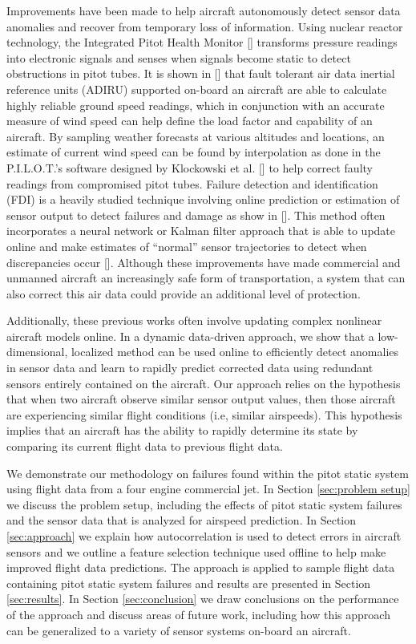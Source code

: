 \documentclass[]{aiaa-tc}
\begin{document}
Improvements have been made to help aircraft autonomously detect sensor data anomalies and recover from temporary loss of information. Using nuclear reactor technology, the Integrated Pitot Health Monitor [] transforms pressure readings into electronic signals and senses when signals become static to detect obstructions in pitot tubes. It is shown in [] that fault tolerant air data inertial reference units (ADIRU) supported on-board an aircraft are able to calculate highly reliable ground speed readings, which in conjunction with an accurate measure of wind speed can help define the load factor and capability of an aircraft. By sampling weather forecasts at various altitudes and locations, an estimate of current wind speed can be found by interpolation as done in the P.I.L.O.T.'s software designed by Klockowski et al. [] to help correct faulty readings from compromised pitot tubes. Failure detection and identification (FDI) is a heavily studied technique involving online prediction or estimation of sensor output to detect failures and damage as show in []. This method often incorporates a neural network or Kalman filter approach that is able to update online and make estimates of ``normal'' sensor trajectories to  detect when discrepancies occur [].  Although these improvements have made commercial and unmanned aircraft an increasingly safe form of transportation, a system that can also correct this air data could provide an additional level of protection. 

Additionally, these previous works often involve updating complex nonlinear aircraft models online. In a dynamic data-driven approach, we show that a low-dimensional, localized method can be used online to efficiently detect anomalies in sensor data and learn to rapidly predict corrected data using redundant sensors entirely contained on the aircraft. Our approach relies on the hypothesis that when two aircraft observe similar sensor output values, then those aircraft are experiencing similar flight conditions (i.e, similar airspeeds). This hypothesis implies that an aircraft has the ability to rapidly determine its state by comparing its current flight data to previous flight data. 

We demonstrate our methodology on failures found within the pitot static system using flight data from a four engine commercial jet. In Section \ref{sec:problem setup} we discuss the problem setup, including the effects of pitot static system failures and the sensor data that is analyzed for airspeed prediction. In Section \ref{sec:approach} we explain how autocorrelation is used to detect errors in aircraft sensors and we outline a feature selection technique used offline to help make improved flight data predictions. The approach is applied to sample flight data containing pitot static system failures and results are presented in Section \ref{sec:results}. In Section \ref{sec:conclusion} we draw conclusions on the performance of the approach and discuss areas of future work, including how this approach can be generalized to a variety of sensor systems on-board an aircraft. 
\end{document}
